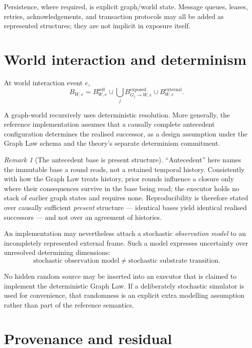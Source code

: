 \documentclass[11pt,a4paper]{article}
\theoremstyle{remark}
\newtheorem{remark}[theorem]{Remark}
\begin{document}
Persistence, where required, is explicit graph/world state. Message queues, leases, retries, acknowledgements, and transaction protocols may all be added as represented structures; they are not implicit in exposure itself.

\section{World interaction and determinism}\label{sec:world}

At world interaction event $e$,
\[
B_{W,e}
=
B_{W,e}^{\mathrm{self}}
\cup
\bigcup_j
B_{G_j\rightarrow W,e}^{\mathrm{exposed}}
\cup
B_{W,e}^{\mathrm{external}}.
\]

A graph-world recursively uses deterministic resolution. More generally, the reference implementation assumes that a causally complete antecedent configuration determines the realised successor, as a design assumption under the Graph Law schema and the theory's separate determinism commitment.

\begin{remark}[The antecedent base is present structure]\label{rem:base-is-present}
``Antecedent'' here names the immutable base a round reads, not a retained temporal history. Consistently with how the Graph Law treats history, prior rounds influence a closure only where their consequences survive in the base being read; the executor holds no stack of earlier graph states and requires none. Reproducibility is therefore stated over causally sufficient \emph{present} structure --- identical bases yield identical realised successors --- and not over an agreement of histories.
\end{remark}

An implementation may nevertheless attach a stochastic \emph{observation model} to an incompletely represented external frame. Such a model expresses uncertainty over unresolved determining dimensions:
\[
\boxed{
\text{stochastic observation model}
\neq
\text{stochastic substrate transition}.
}
\]

No hidden random source may be inserted into an executor that is claimed to implement the deterministic Graph Law. If a deliberately stochastic simulator is used for convenience, that randomness is an explicit extra modelling assumption rather than part of the reference semantics.

\section{Provenance and residual}\label{sec:residual}
\end{document}
